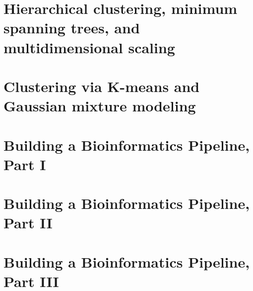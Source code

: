 \documentclass[10pt,oneside,bigheadings,tablecaptionabove]{scrbook}
\begin{document}
\chapter{Hierarchical clustering, minimum spanning trees, and multidimensional scaling}


\chapter{Clustering via K-means and Gaussian mixture modeling}


\chapter{Building a Bioinformatics Pipeline, Part I}


\chapter{Building a Bioinformatics Pipeline, Part II}


\chapter{Building a Bioinformatics Pipeline, Part III}



% 
% 
% 
% 
\end{document}

